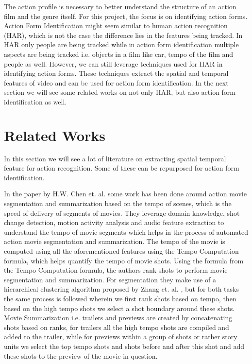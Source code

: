 \documentclass[12pt]{report}
\begin{document}
	The action profile is necessary to better understand the structure of an action film and the genre itself. For this project, the  focus is on identifying action forms. Action Form Identification might seem similar to human action recognition (HAR), which is not the case the difference lies in the features being tracked. In HAR only people are being tracked while in action form identification multiple aspects are being tracked i.e. objects in a film like car, tempo of the film and people as well. However, we can still leverage techniques used for HAR in identifying action forms. These techniques extract the spatial and temporal features of video and can be used for action form identification. In the next section we will see some related works on not only HAR, but also action form identification as well.
	\chapter{Related Works}
	
	In this section we will see a lot of literature on extracting spatial temporal feature for action recognition. Some of these can be repurposed for action form identification.
	
	\cite{h_w-chen} In the paper by H.W. Chen et. al. some work has been done around action movie segmentation and summarization based on the tempo of scenes, which is the speed of delivery of segments of movies. They leverage domain knowledge, shot change detection, motion activity analysis and audio feature extraction to understand the tempo of movie segments which helps in the process of automated action movie segmentation and summarization. The tempo of the movie is computed using all the aforementioned features using the Tempo Computation formula, which helps quantify the tempo of movie shots. Using the formula from the Tempo Computation formula, the authors rank shots to perform movie segmentation and summarization. For segmentation they make use of a hierarchical clustering algorithm proposed by Zhang et. al. \cite{zhang}, but for both tasks the same process is followed wherein we first rank shots based on tempo, then based on the high tempo shots we select a shot boundary around these shots. Movie Summarization i.e. trailers and previews are created by concatenating shots based on ranks, for trailers all the high tempo shots are compiled and added to the trailer, while for previews within a group of shots or rather story units we select the top tempo shots and shots before and after this shot and add these shots to the preview of the movie in question.
	
\end{document}
